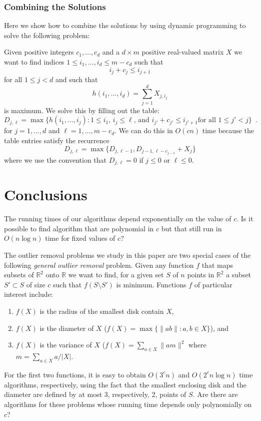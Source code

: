 \documentclass[lotsofwhite]{patmorin}
\begin{document}
\subsubsection{Combining the Solutions}

Here we show how to combine the solutions by using dynamic programming
to solve the following problem:

Given positive integers $c_1,\ldots,c_d$ and a $d\times m$ positive
real-valued matrix $X$
we want to find indices $1\le i_1,\ldots,i_d \le m-c_d$ such that
\[
    i_j + c_j \le i_{j+1}
\]
for all $1\le j < d$ and such that
\[
      h(i_1,\ldots,i_d)=\sum_{j=1}^d X_{j,i_j}
\]
is maximum.  We solve this by filling out the table:
\[
     D_{j,\ell} = \max\{h(i_1,\ldots,i_j):
      \mbox{$1\le i_1$, $i_j\le \ell$, and $i_{j'}+c_{j'}\le i_{j'+1}$
             for all $1\le j'< j$}  \} \enspace .
\]
for $j=1,\ldots,d$ and $\ell=1,\ldots,m-c_d$.  We can do this in
$O(cn)$ time because the table entries satisfy the recurrence
\[
     D_{j,\ell} = \max\{D_{j,\ell-1},D_{j-1,\ell-c_{j-1}}+X_j \}
\]
where we use the convention that $D_{j,\ell} = 0$ if $j\le 0$ or
$\ell\le 0$.


\section{Conclusions}

The running times of our algorithms depend exponentially on the value
of $c$.  Is it possible to find algorithm that are polynomial in $c$
but that still run in $O(n\log n)$ time for fixed values of $c$?

The outlier removal problems we study in this paper are two special
cases of the following \emph{general outlier removal} problem.  Given
any function $f$ that maps subsets of $\mathbb{R}^2$ onto $\mathbb{R}$
we want to find, for a given set $S$ of $n$ points in $\mathbb{R}^2$ a
subset $S'\subset S$ of size $c$ such that $f(S\setminus S')$ is
minimum.  Functions $f$ of particular interest include:
\begin{enumerate}
\item $f(X)$ is the radius of the smallest disk contain $X$,
\item $f(X)$ is the diameter of $X$ ($f(X)=\max\{\|ab\|:a,b\in X\}$), and
\item $f(X)$ is the variance of $X$ ($f(X)=\sum_{a\in X} \| am \|^2$
where $m=\sum_{a\in X} a/|X|$.
\end{enumerate}
For the first two functions, it is easy to obtain $O(3^c n)$ and
$O(2^cn\log n)$ time algorithms, respectively, using the fact that the
smallest enclosing disk and the diameter are defined by at most 3,
respectively, 2, points of $S$.  Are there are algorithms for these
problems whose running time depends only polynomially on $c$?
\end{document}
